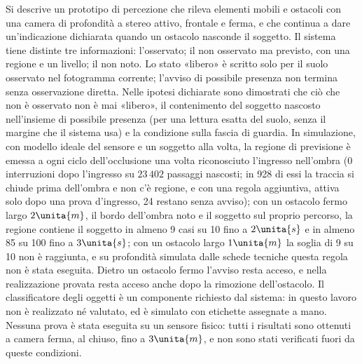Si descrive un prototipo di percezione che rileva elementi mobili e ostacoli con una camera di profondità a stereo attivo, frontale e ferma, e che continua a dare un'indicazione dichiarata quando un ostacolo nasconde il soggetto. Il sistema tiene distinte tre informazioni: l'osservato; il non osservato ma previsto, con una regione e un livello; il non noto. Lo stato «libero» è scritto solo per il suolo osservato nel fotogramma corrente; l'avviso di possibile presenza non termina senza osservazione diretta. Nelle ipotesi dichiarate sono dimostrati che ciò che non è osservato non è mai «libero», il contenimento del soggetto nascosto nell'insieme di possibile presenza (per una lettura esatta del suolo, senza il margine che il sistema usa) e la condizione sulla fascia di guardia. In simulazione, con modello ideale del sensore e un soggetto alla volta, la regione di previsione è emessa a ogni ciclo dell'occlusione una volta riconosciuto l'ingresso nell'ombra (0 interruzioni dopo l'ingresso su $23\,402$ passaggi nascosti; in 928 di essi la traccia si chiude prima dell'ombra e non c'è regione, e con una regola aggiuntiva, attiva solo dopo una prova d'ingresso, 24 restano senza avviso); con un ostacolo fermo largo $2\unita{m}$, il bordo dell'ombra noto e il soggetto sul proprio percorso, la regione contiene il soggetto in almeno 9 casi su 10 fino a $2\unita{s}$ e in almeno 85 su 100 fino a $3\unita{s}$; con un ostacolo largo $1\unita{m}$ la soglia di 9 su 10 non è raggiunta, e su profondità simulata dalle schede tecniche questa regola non è stata eseguita. Dietro un ostacolo fermo l'avviso resta acceso, e nella realizzazione provata resta acceso anche dopo la rimozione dell'ostacolo. Il classificatore degli oggetti è un componente richiesto dal sistema: in questo lavoro non è realizzato né valutato, ed è simulato con etichette assegnate a mano. Nessuna prova è stata eseguita su un sensore fisico: tutti i risultati sono ottenuti a camera ferma, al chiuso, fino a $3\unita{m}$, e non sono stati verificati fuori da queste condizioni.
